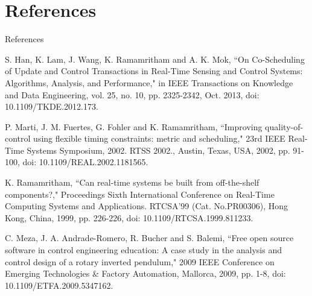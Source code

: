\documentclass{beamer}
\begin{document}
\section{References}
\begin{frame}{References}
\begin{thebibliography}{111}
    \footnotesize{S. Han, K. Lam, J. Wang, K. Ramamritham and A. K. Mok, ``On Co-Scheduling of Update and Control Transactions in Real-Time Sensing and Control Systems: Algorithms, Analysis, and Performance," in IEEE Transactions on Knowledge and Data Engineering, vol. 25, no. 10, pp. 2325-2342, Oct. 2013, doi: 10.1109/TKDE.2012.173.}
    
    P. Marti, J. M. Fuertes, G. Fohler and K. Ramamritham, ``Improving quality-of-control using flexible timing constraints: metric and scheduling," 23rd IEEE Real-Time Systems Symposium, 2002. RTSS 2002., Austin, Texas, USA, 2002, pp. 91-100, doi: 10.1109/REAL.2002.1181565.
    
    K. Ramamritham, ``Can real-time systems be built from off-the-shelf components?," Proceedings Sixth International Conference on Real-Time Computing Systems and Applications. RTCSA'99 (Cat. No.PR00306), Hong Kong, China, 1999, pp. 226-226, doi: 10.1109/RTCSA.1999.811233.
    
    C. Meza, J. A. Andrade-Romero, R. Bucher and S. Balemi, ``Free open source software in control engineering education: A case study in the analysis and control design of a rotary inverted pendulum," 2009 IEEE Conference on Emerging Technologies \& Factory Automation, Mallorca, 2009, pp. 1-8, doi: 10.1109/ETFA.2009.5347162.

\end{thebibliography}
\end{frame}
\end{document}
